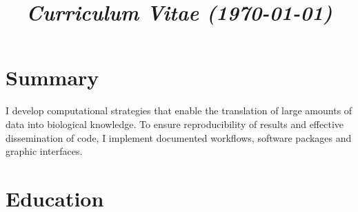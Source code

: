 \documentclass[11pt,a4paper,sans]{moderncv} %
\title{\emph{Curriculum Vitae (\today)}}
\begin{document}
\makecvtitle %
\vspace{-1.2cm}
\section{Summary}
I develop computational strategies that enable
the translation of large amounts of data into biological knowledge. 
To ensure reproducibility of results and effective
dissemination of code, I implement documented workflows, software 
packages and graphic interfaces.

\section{Education}


\end{document}
